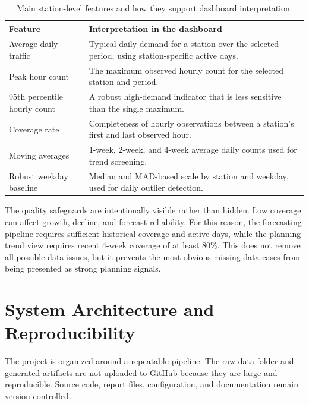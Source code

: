\documentclass[11pt]{article}
\begin{document}
\begin{table}[htbp]
\centering
\caption{Main station-level features and how they support dashboard interpretation.}
\small
\begin{tabularx}{0.96\textwidth}{lX}
\toprule
\textbf{Feature} & \textbf{Interpretation in the dashboard} \\
\midrule
Average daily traffic & Typical daily demand for a station over the selected period, using station-specific active days. \\
Peak hour count & The maximum observed hourly count for the selected station and period. \\
95th percentile hourly count & A robust high-demand indicator that is less sensitive than the single maximum. \\
Coverage rate & Completeness of hourly observations between a station's first and last observed hour. \\
Moving averages & 1-week, 2-week, and 4-week average daily counts used for trend screening. \\
Robust weekday baseline & Median and MAD-based scale by station and weekday, used for daily outlier detection. \\
\bottomrule
\end{tabularx}
\end{table}

The quality safeguards are intentionally visible rather than hidden. Low coverage can affect growth, decline, and forecast reliability. For this reason, the forecasting pipeline requires sufficient historical coverage and active days, while the planning trend view requires recent 4-week coverage of at least 80\%. This does not remove all possible data issues, but it prevents the most obvious missing-data cases from being presented as strong planning signals.

\section{System Architecture and Reproducibility}

The project is organized around a repeatable pipeline. The raw data folder and generated artifacts are not uploaded to GitHub because they are large and reproducible. Source code, report files, configuration, and documentation remain version-controlled.
\end{document}

